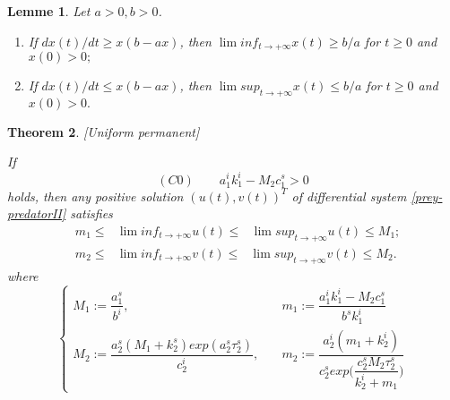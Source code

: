 \documentclass[[a4paper,10pt]{article}
\newtheorem{theorem}{Theorem}[section]
\newtheorem{lemma}[theorem]{Lemme}%
\begin{document}
\begin{lemma}\label{lem1} \cite{chen2007note}	Let $a>0,b>0$.
\begin{enumerate}
\item[1.] If $dx(t)/dt\geq x(b-ax)$, then $\lim  inf_{t\rightarrow +\infty}x(t)\geq b/a$ for $t\geq 0$ and $x(0)>0;$
\item[2.] If $dx(t)/dt\leq x(b-ax)$, then $\lim sup_{t\rightarrow +\infty}x(t)\leq b/a$ for $t\geq 0$ and $x(0)>0.$
\end{enumerate} 
\end{lemma}



\begin{theorem}\label{uniformpermanent}[Uniform permanent]
\item If 
$$(C0)\qquad a_1^ik_1^i-M_2 c_1^s>0$$
holds, then  any  positive solution $(u(t),v(t))^T$ of differential system \eqref{prey-predatorII} satisfies 
$$\begin{aligned}
&m_1\leq\text{ } \lim inf_{t\rightarrow +\infty} u(t)\leq\text{  }\lim  sup_{t\rightarrow +\infty} u(t)\leq  M_1  ;\\
&m_2 \leq \text{ } \lim inf_{t\rightarrow +\infty} v(t)\leq \text{  } \lim sup_{t\rightarrow +\infty} v(t)\leq M_2.
\end{aligned}$$ 
where \[\left\{\begin{aligned}
 M_1:=\dfrac{a_1^s}{b^i}, \quad & m_1:=\dfrac{a_1^ik_1^i-M_2  c_1^s}{b^s k^i_1}\\
 M_2:=\dfrac{a^s_2(M_1+k_2^s) exp(a^s_2 \tau_2^s)}{c_2^i},\quad & m_2:=\dfrac{a_2^i(m_1+k_2^i)}{c_2^sexp\bigg(\dfrac{c_2^s M_2\tau_2^s}{k_2^i+m_1}\bigg)}
\end{aligned}
\right.\]
\end{theorem}
\end{document}
